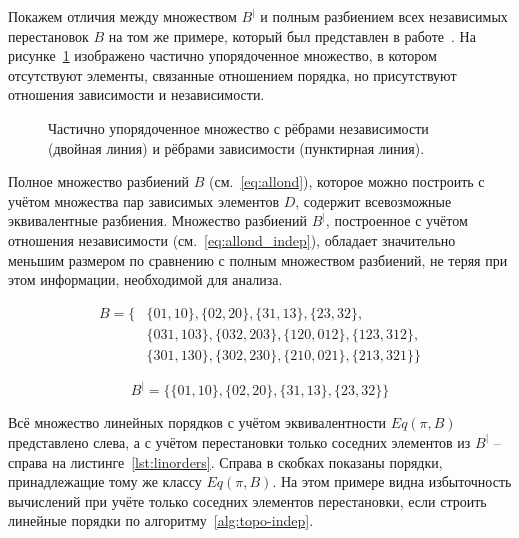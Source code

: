 Покажем отличия между множеством $B^{|}$ и полным разбиением всех
независимых перестановок $B$ на том же примере, который был
представлен в работе~\cite{sitito_1}. На
рисунке~\ref{fig:litmus-indep-dep} изображено частично упорядоченное
множество, в котором отсутствуют элементы, связанные отношением
порядка, но присутствуют отношения зависимости и независимости.

\begin{figure}[htbp]
  \centerfloat{
    
  }
  \caption{Частично упорядоченное множество с рёбрами независимости
  (двойная линия) и рёбрами зависимости (пунктирная линия).}
  \label{fig:litmus-indep-dep}
\end{figure}

Полное множество разбиений $B$ (см.~\ref{eq:allond}), которое можно
построить с учётом множества пар зависимых элементов $D$, содержит
всевозможные эквивалентные разбиения. Множество разбиений $B^{|}$,
построенное с учётом отношения независимости
(см.~\ref{eq:allond_indep}), обладает значительно меньшим размером по
сравнению с полным множеством разбиений, не теряя при этом
информации, необходимой для анализа.

\begin{equation}\label{eq:allond}
  \begin{aligned}
    B = \{&\{01, 10\},\{02, 20\},\{31, 13\},\{23, 32\},         \\
      &\{031, 103\},\{032, 203\},\{120, 012\},\{123, 312\}, \\
    &\{301, 130\},\{302, 230\},\{210, 021\},\{213, 321\}\}
  \end{aligned}
\end{equation}

\begin{equation}\label{eq:allond_indep}
  B^{|} = \{\{01, 10\},\{02, 20\},\{31, 13\},\{23, 32\}\}
\end{equation}



Всё множество линейных порядков с учётом эквивалентности $Eq(\pi, B)$
представлено слева, а с учётом перестановки только соседних элементов
из $B^{|}$ -- справа на
листинге~\ref{lst:linorders}. Справа в скобках показаны порядки,
принадлежащие тому же классу $Eq(\pi, B)$. На этом примере видна
избыточность вычислений при учёте только соседних элементов
перестановки, если строить линейные порядки по
алгоритму~\ref{alg:topo-indep}.

